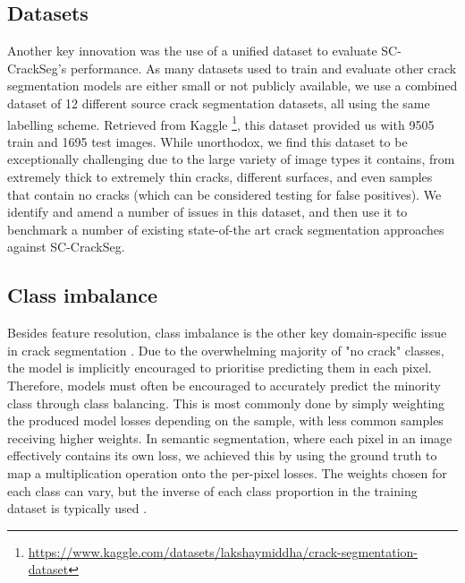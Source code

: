 \documentclass[a4paper,12pt]{report}
\begin{document}
\subsection{Datasets}
Another key innovation was the use of a unified dataset to evaluate SC-CrackSeg's performance. As many datasets used to train and evaluate other crack segmentation models are either small or not publicly available, we use a combined dataset of 12 different source crack segmentation datasets, all using the same labelling scheme. Retrieved from Kaggle \footnote{\url{https://www.kaggle.com/datasets/lakshaymiddha/crack-segmentation-dataset}}, this dataset provided us with 9505 train and 1695 test images. While unorthodox, we find this dataset to be exceptionally challenging due to the large variety of image types it contains, from extremely thick to extremely thin cracks, different surfaces, and even samples that contain no cracks (which can be considered testing for false positives). We identify and amend a number of issues in this dataset, and then use it to benchmark a number of existing state-of-the art crack segmentation approaches against SC-CrackSeg.

\subsection{Class imbalance}
Besides feature resolution, class imbalance is the other key domain-specific issue in crack segmentation \cite{hamishebahar_comprehensive_2022}. Due to the overwhelming majority of "no crack" classes, the model is implicitly encouraged to prioritise predicting them in each pixel. Therefore, models must often be encouraged to accurately predict the minority class through class balancing. This is most commonly done by simply weighting the produced model losses depending on the sample, with less common samples receiving higher weights. In semantic segmentation, where each pixel in an image effectively contains its own loss, we achieved this by using the ground truth to map a multiplication operation onto the per-pixel losses. The weights chosen for each class can vary, but the inverse of each class proportion in the training dataset is typically used \cite{kochkarev_data_2020}.

\pagebreak
\end{document}
